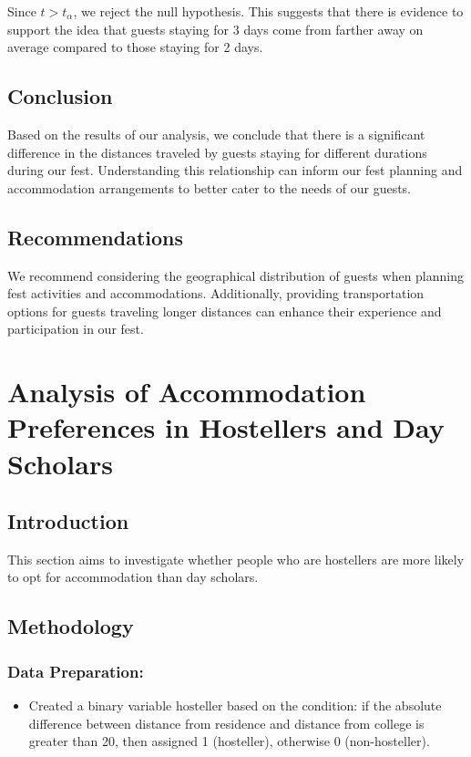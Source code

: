\documentclass[oneside]{book}
\begin{document}
Since $t > t_{\alpha}$, we reject the null hypothesis. This suggests that there is evidence to support the idea that guests staying for 3 days come from farther away on average compared to those staying for 2 days.

\section{Conclusion}
Based on the results of our analysis, we conclude that there is a significant difference in the distances traveled by guests staying for different durations during our fest. Understanding this relationship can inform our fest planning and accommodation arrangements to better cater to the needs of our guests.

\section{Recommendations}
We recommend considering the geographical distribution of guests when planning fest activities and accommodations. Additionally, providing transportation options for guests traveling longer distances can enhance their experience and participation in our fest.

\chapter{Analysis of Accommodation Preferences in Hostellers and Day Scholars}

\section{Introduction}
This section aims to investigate whether people who are hostellers are more likely to opt for accommodation than day scholars.

\section{Methodology}

\subsection{Data Preparation:}

\begin{itemize}
\item Created a binary variable \(\text{hosteller}\) based on the condition: if the absolute difference between distance from residence and distance from college is greater than 20, then assigned 1 (hosteller), otherwise 0 (non-hosteller).
\end{itemize}
    
\end{document}
